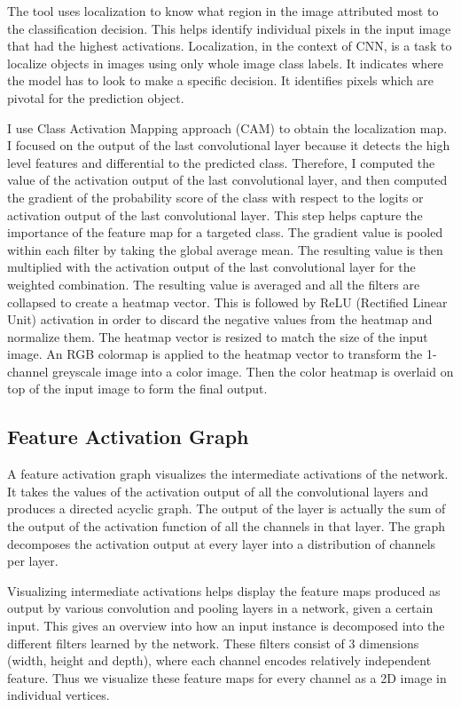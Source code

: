 The tool uses localization to know what region in the image attributed most to the classification decision. This helps identify individual pixels in the input image that had the highest activations. Localization, in the context of CNN, is a task to localize objects in images using only whole image class labels. It indicates where the model has to look to make a specific decision. It identifies pixels which are pivotal for the prediction object.

I use Class Activation Mapping approach (CAM) to obtain the localization map. I focused on the output of the last convolutional layer because it detects the high level features and differential to the predicted class. Therefore, I computed the value of the activation output of the last convolutional layer, and then computed the gradient of the probability score of the class with respect to the logits or activation output of the last convolutional layer. This step helps capture the importance of the feature map for a targeted class. The gradient value is pooled within each filter by taking the global average mean. The resulting value is then multiplied with the activation output of the last convolutional layer for the weighted combination. The resulting value is averaged and all the filters are collapsed to create a heatmap vector. This is followed by ReLU (Rectified Linear Unit) activation in order to discard the negative values from the heatmap and normalize them. The heatmap vector is resized to match the size of the input image. An RGB colormap is applied to the heatmap vector to transform the 1-channel greyscale image into a color image. Then the color heatmap is overlaid on top of the input image to form the final output.

\subsection{Feature Activation Graph}

A feature activation graph visualizes the intermediate activations of the network. It takes the values of the activation output of all the convolutional layers and produces a directed acyclic graph. The output of the layer is actually the sum of the output of the activation function of all the channels in that layer. The graph decomposes the activation output at every layer into a distribution of channels per layer.

Visualizing intermediate activations helps display the feature maps produced as output by various convolution and pooling layers in a network, given a certain input. This gives an overview into how an input instance is decomposed into the different filters learned by the network. These filters consist of 3 dimensions (width, height and depth), where each channel encodes relatively independent feature. Thus we visualize these feature maps for every channel as a 2D image in individual vertices.

